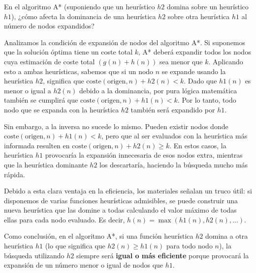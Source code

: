 \documentclass[11pt, a4paper]{article}
\newenvironment{problem}[1][Cuestión]{
	\vspace{0.5cm}
	\noindent{\Large\bfseries #1} \par\vspace{0.5cm}
}{
	\vspace{0.5cm}
}
\begin{document}
	\begin{problem}[Cuestión 2 (10\%)]
		En el algoritmo A* (suponiendo que un heurístico $h2$ domina sobre un heurístico $h1$), ¿cómo afecta la dominancia de una heurística $h2$ sobre otra heurística $h1$ al número de nodos expandidos?

		{ \color{blue} 
			Analizamos la condición de expansión de nodos del algoritmo A*. Si suponemos que la solución óptima tiene un coste total $k$, A* deberá expandir todos los nodos cuya estimación de coste total $(g(n)+h(n))$ sea menor que $k$. Aplicando esto a ambas heurísticas, sabemos que si un nodo $n$ se expande usando la heurística $h2$, significa que $\text{coste}(\text{origen},n)+h2(n)<k$. Dado que $h1(n)$ es menor o igual a $h2(n)$ debido a la dominancia, por pura lógica matemática también se cumplirá que $\text{coste}(\text{origen},n)+h1(n)<k$. Por lo tanto, todo nodo que se expanda con la heurística $h2$ también será expandido por $h1$.

			Sin embargo, a la inversa no sucede lo mismo. Pueden existir nodos donde $\text{coste}(\text{origen},n)+h1(n)<k$, pero que al ser evaluados con la heurística más informada resulten en $\text{coste}(\text{origen},n)+h2(n) \ge k$. En estos casos, la heurística $h1$ provocaría la expansión innecesaria de esos nodos extra, mientras que la heurística dominante $h2$ los descartaría, haciendo la búsqueda mucho más rápida.

			Debido a esta clara ventaja en la eficiencia, los materiales señalan un truco útil: si disponemos de varias funciones heurísticas admisibles, se puede construir una nueva heurística que las domine a todas calculando el valor máximo de todas ellas para cada nodo evaluado. Es decir, $h(n)=\max(h1(n),h2(n),...)$.

			Como conclusión, en el algoritmo A*, si una función heurística $h2$ domina a otra heurística $h1$ (lo que significa que $h2(n) \ge h1(n)$ para todo nodo $n$), la búsqueda utilizando $h2$ siempre será \textbf{igual o más eficiente} porque provocará la expansión de un número menor o igual de nodos que $h1$.
		}

		\vspace{0.5cm}
	\end{problem}
\end{document}
